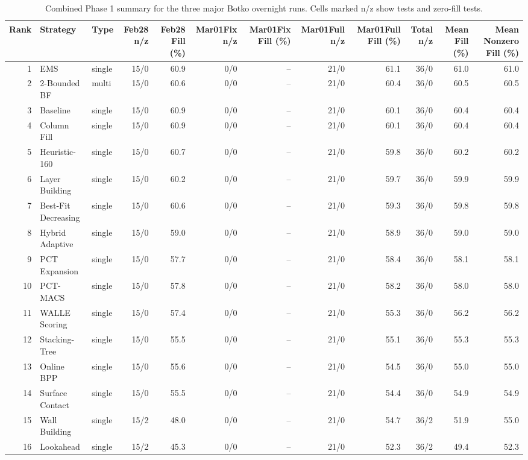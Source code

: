 \begin{table}[htbp]
\centering
\caption{Combined Phase 1 summary for the three major Botko overnight runs. Cells marked n/z show tests and zero-fill tests.}
\label{tab:botko-last-three-runs}
\small
\setlength{\tabcolsep}{4pt}
\begin{tabular}{rllrrrrrrrrr}
\toprule
Rank & Strategy & Type & Feb28 n/z & Feb28 Fill (\%) & Mar01Fix n/z & Mar01Fix Fill (\%) & Mar01Full n/z & Mar01Full Fill (\%) & Total n/z & Mean Fill (\%) & Mean Nonzero Fill (\%) \\
\midrule
1 & EMS & single & 15/0 & 60.9 & 0/0 & -- & 21/0 & 61.1 & 36/0 & 61.0 & 61.0 \\
2 & 2-Bounded BF & multi & 15/0 & 60.6 & 0/0 & -- & 21/0 & 60.4 & 36/0 & 60.5 & 60.5 \\
3 & Baseline & single & 15/0 & 60.9 & 0/0 & -- & 21/0 & 60.1 & 36/0 & 60.4 & 60.4 \\
4 & Column Fill & single & 15/0 & 60.9 & 0/0 & -- & 21/0 & 60.1 & 36/0 & 60.4 & 60.4 \\
5 & Heuristic-160 & single & 15/0 & 60.7 & 0/0 & -- & 21/0 & 59.8 & 36/0 & 60.2 & 60.2 \\
6 & Layer Building & single & 15/0 & 60.2 & 0/0 & -- & 21/0 & 59.7 & 36/0 & 59.9 & 59.9 \\
7 & Best-Fit Decreasing & single & 15/0 & 60.6 & 0/0 & -- & 21/0 & 59.3 & 36/0 & 59.8 & 59.8 \\
8 & Hybrid Adaptive & single & 15/0 & 59.0 & 0/0 & -- & 21/0 & 58.9 & 36/0 & 59.0 & 59.0 \\
9 & PCT Expansion & single & 15/0 & 57.7 & 0/0 & -- & 21/0 & 58.4 & 36/0 & 58.1 & 58.1 \\
10 & PCT-MACS & single & 15/0 & 57.8 & 0/0 & -- & 21/0 & 58.2 & 36/0 & 58.0 & 58.0 \\
11 & WALLE Scoring & single & 15/0 & 57.4 & 0/0 & -- & 21/0 & 55.3 & 36/0 & 56.2 & 56.2 \\
12 & Stacking-Tree & single & 15/0 & 55.5 & 0/0 & -- & 21/0 & 55.1 & 36/0 & 55.3 & 55.3 \\
13 & Online BPP & single & 15/0 & 55.6 & 0/0 & -- & 21/0 & 54.5 & 36/0 & 55.0 & 55.0 \\
14 & Surface Contact & single & 15/0 & 55.5 & 0/0 & -- & 21/0 & 54.4 & 36/0 & 54.9 & 54.9 \\
15 & Wall Building & single & 15/2 & 48.0 & 0/0 & -- & 21/0 & 54.7 & 36/2 & 51.9 & 55.0 \\
16 & Lookahead & single & 15/2 & 45.3 & 0/0 & -- & 21/0 & 52.3 & 36/2 & 49.4 & 52.3 \\

\end{tabular}
\end{table}
